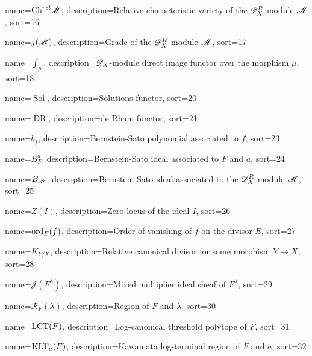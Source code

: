 {
  name={\ensuremath{\Chrel \M}},
  description={Relative characteristic variety of the $\mathscr{D}_X^R$-module $\mathscr{M}$},
  sort=16
}


{
  name={\ensuremath{j(\M)}},
  description={Grade of the $\mathscr{D}_X^R$-module $\mathscr{M}$},
  sort=17
}


{
  name={\ensuremath{\int_\mu}},
  description={$\mathscr{D}_X$-module direct image functor over the morphism $\mu$},
  sort=18
}





{
  name={\ensuremath{\operatorname{Sol}}},
  description={Solutions functor},
  sort=20
}


{
  name={\ensuremath{\operatorname{DR}}},
  description={de Rham functor},
  sort=21
}




{
  name={\ensuremath{b_f}},
  description={Bernstein-Sato polynomial associated to $f$},
  sort=23
}



{
  name={\ensuremath{B_F^a}},
  description={Bernstein-Sato ideal associated to $F$ and $a$},
  sort=24
}


{
  name={\ensuremath{B_\M}},
  description={Bernstein-Sato ideal associated to the  $\mathscr{D}_X^R$-module $\mathscr{M}$},
  sort=25
}


{
  name={\ensuremath{Z(I)}},
  description={Zero locus of the ideal $I$},
  sort=26
}


{
  name={\ensuremath{\ord_E(f)}},
  description={Order of vanishing of $f$ on the divisor $E$},
  sort=27
}


{
  name={\ensuremath{K_{Y/X}}},
  description={Relative canonical divisor for some morphism $Y\to X$},
  sort=28
}


{
  name={\ensuremath{\mathcal{J}(F^\lambda)}},
  description={Mixed multiplier ideal sheaf of $F^\lambda$},
  sort=29
}


{
  name={\ensuremath{\mathcal{R}_F(\lambda)}},
  description={Region of $F$ and $\lambda$},
  sort=30
}


{
  name={\ensuremath{\LCT(F)}},
  description={Log-canonical threshold polytope of $F$},
  sort=31
}


{
  name={\ensuremath{\KLT_a(F)}},
  description={Kawamata log-terminal region of $F$ and $a$},
  sort=32
}

